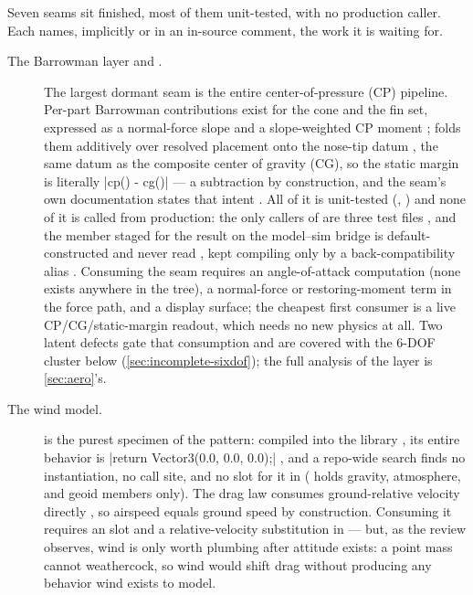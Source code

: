 Seven seams sit finished, most of them unit-tested, with no production caller. Each names, implicitly or in
an in-source comment, the work it is waiting for.

\begin{description}

\item[The Barrowman layer and .] The largest dormant seam is the entire
center-of-pressure (CP) pipeline. Per-part Barrowman contributions exist for the cone and
the fin set, expressed as a normal-force slope  and a slope-weighted CP moment
 ;  folds them
additively over resolved placement onto the nose-tip datum ,
the same datum as the composite center of gravity (CG), so the static margin is literally
\cppinline|cp() - cg()| --- a subtraction by construction, and the seam's own documentation
states that intent . All of it is unit-tested
(, ) and none of it is
called from production: the only callers of  are three test files
, and the  member staged for the
result on the model--sim bridge is default-constructed and never read
, kept compiling only by a back-compatibility alias
. Consuming the seam requires an angle-of-attack computation (none
exists anywhere in the tree), a normal-force or restoring-moment term in the force path,
and a display surface; the cheapest first consumer is a live CP/CG/static-margin readout,
which needs no new physics at all. Two latent defects gate that consumption and are covered
with the 6-DOF cluster below (\cref{sec:incomplete-sixdof}); the full analysis of the layer
is \cref{sec:aero}'s.

\item[The wind model.]  is the purest specimen of the pattern: compiled
into the  library , its entire behavior is
\cppinline|return Vector3(0.0, 0.0, 0.0);| , and a repo-wide
search finds no instantiation, no call site, and no slot for it in 
( holds gravity, atmosphere, and geoid members only). The drag law
consumes ground-relative velocity directly , so airspeed
equals ground speed by construction. Consuming it requires an  slot and a
relative-velocity substitution in  --- but, as the review observes, wind
is only worth plumbing after attitude exists: a point mass cannot weathercock, so wind
would shift drag without producing any behavior wind exists to model.


\end{description}
